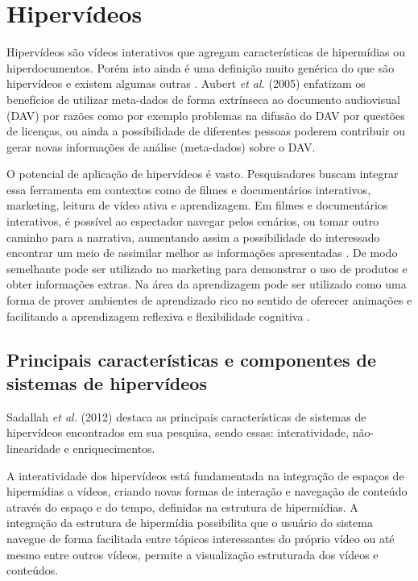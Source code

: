 \section{Hipervídeos}

Hipervídeos são vídeos interativos que agregam características de hipermídias ou hiperdocumentos. Porém isto ainda é uma definição muito genérica do que são hipervídeos e existem algumas outras \cite{chambel2004}. Aubert \textit{et al.} (2005) enfatizam os benefícios de utilizar meta-dados de forma extrínseca ao documento audiovisual (DAV) por razões como por exemplo problemas na difusão do DAV por questões de licenças, ou ainda a possibilidade de diferentes pessoas poderem contribuir ou gerar novas informações de análise (meta-dados) sobre o DAV.

O potencial de aplicação de hipervídeos é vasto. Pesquisadores buscam integrar essa ferramenta em contextos como de filmes e documentários interativos, marketing, leitura de vídeo ativa e aprendizagem. Em filmes e documentários interativos, é possível ao espectador navegar pelos cenários, ou tomar outro caminho para a narrativa, aumentando assim a possibilidade do interessado encontrar um meio de assimilar melhor as informações apresentadas \cite{mozilla2012, sawhney1996, lippman1980, shipman2003}. De modo semelhante pode ser utilizado no marketing para demonstrar o uso de produtos e obter informações extras. Na área da aprendizagem pode ser utilizado como uma forma de prover ambientes de aprendizado rico no sentido de oferecer animações e facilitando a aprendizagem reflexiva e flexibilidade cognitiva \cite{zhan2004, shipman2003}.

\subsection{Principais características e componentes de sistemas de hipervídeos}

Sadallah \textit{et al.} (2012) destaca as principais características de sistemas de hipervídeos encontrados em sua pesquisa, sendo essas: interatividade, não-linearidade e enriquecimentos.

A interatividade dos hipervídeos está fundamentada na integração de espaços de hipermídias a vídeos, criando novas formas de interação e navegação de conteúdo através do espaço e do tempo, definidas na estrutura de hipermídias. A integração da estrutura de hipermídia possibilita que o usuário do sistema navegue de forma facilitada entre tópicos interessantes do próprio vídeo ou até mesmo entre outros vídeos, permite a visualização estruturada dos vídeos e conteúdos.

